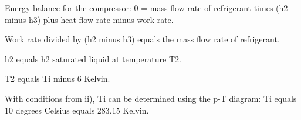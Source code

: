 Energy balance for the compressor:  
0 = mass flow rate of refrigerant times (h2 minus h3) plus heat flow rate minus work rate.  

Work rate divided by (h2 minus h3) equals the mass flow rate of refrigerant.  

h2 equals h2 saturated liquid at temperature T2.  

T2 equals Ti minus 6 Kelvin.  

With conditions from ii), Ti can be determined using the p-T diagram:  
Ti equals 10 degrees Celsius equals 283.15 Kelvin.